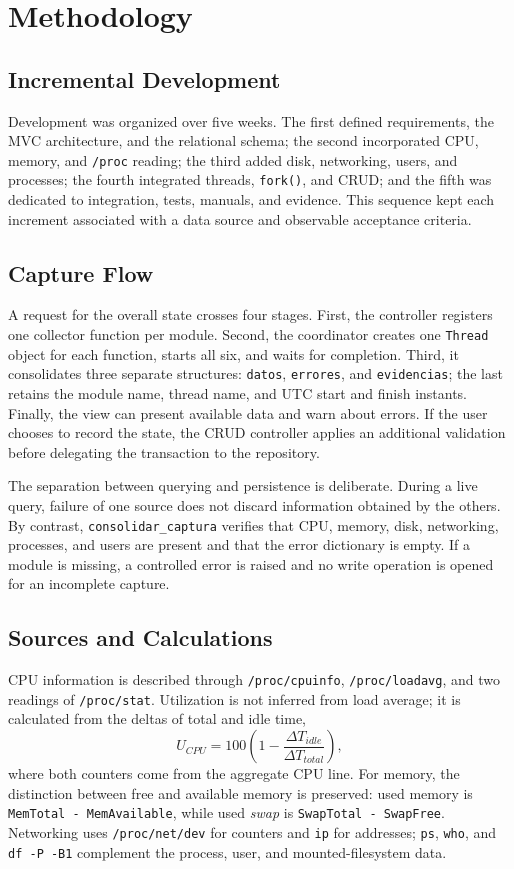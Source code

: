 \documentclass[conference]{IEEEtran}
\begin{document}
\section{Methodology}
\subsection{Incremental Development}
Development was organized over five weeks. The first defined requirements, the MVC architecture, and the relational schema; the second incorporated CPU, memory, and \texttt{/proc} reading; the third added disk, networking, users, and processes; the fourth integrated threads, \texttt{fork()}, and CRUD; and the fifth was dedicated to integration, tests, manuals, and evidence. This sequence kept each increment associated with a data source and observable acceptance criteria.

\subsection{Capture Flow}
A request for the overall state crosses four stages. First, the controller registers one collector function per module. Second, the coordinator creates one \texttt{Thread} object for each function, starts all six, and waits for completion. Third, it consolidates three separate structures: \texttt{datos}, \texttt{errores}, and \texttt{evidencias}; the last retains the module name, thread name, and UTC start and finish instants. Finally, the view can present available data and warn about errors. If the user chooses to record the state, the CRUD controller applies an additional validation before delegating the transaction to the repository.

The separation between querying and persistence is deliberate. During a live query, failure of one source does not discard information obtained by the others. By contrast, \texttt{consolidar\_captura} verifies that CPU, memory, disk, networking, processes, and users are present and that the error dictionary is empty. If a module is missing, a controlled error is raised and no write operation is opened for an incomplete capture.

\subsection{Sources and Calculations}
CPU information is described through \texttt{/proc/cpuinfo}, \texttt{/proc/loadavg}, and two readings of \texttt{/proc/stat}. Utilization is not inferred from load average; it is calculated from the deltas of total and idle time,
\begin{equation}
U_{CPU}=100\left(1-\frac{\Delta T_{idle}}{\Delta T_{total}}\right),
\end{equation}
where both counters come from the aggregate CPU line. For memory, the distinction between free and available memory is preserved: used memory is \texttt{MemTotal - MemAvailable}, while used \textit{swap} is \texttt{SwapTotal - SwapFree}. Networking uses \texttt{/proc/net/dev} for counters and \texttt{ip} for addresses; \texttt{ps}, \texttt{who}, and \texttt{df -P -B1} complement the process, user, and mounted-filesystem data.
\end{document}
